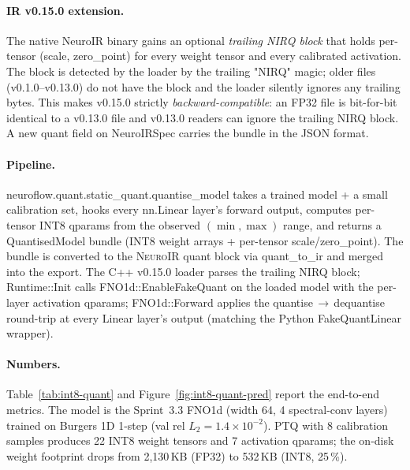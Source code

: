 \documentclass[10pt,twocolumn]{article}
\renewcommand{\texttt}[1]{{\normalfont\ttfamily #1}\normalfont\rmfamily}
\newcommand{\neuroir}{\textsc{NeuroIR}}
\begin{document}
\paragraph{IR v0.15.0 extension.}
The native NeuroIR binary gains an optional
\emph{trailing NIRQ block} that holds per-tensor
\texttt{(scale, zero\_point)} for every weight tensor and
every calibrated activation.  The block is detected by
the loader by the trailing \texttt{"NIRQ"} magic; older
files (v0.1.0--v0.13.0) do not have the block and the
loader silently ignores any trailing bytes.  This makes
v0.15.0 strictly \emph{backward-compatible}: an FP32
file is bit-for-bit identical to a v0.13.0 file and
v0.13.0 readers can ignore the trailing \texttt{NIRQ}
block.  A new \texttt{quant} field on
\texttt{NeuroIRSpec} carries the bundle in the JSON
format.

\paragraph{Pipeline.}
\texttt{neuroflow.quant.static\_quant.quantise\_model}
takes a trained model + a small calibration set, hooks
every \texttt{nn.Linear} layer's forward output, computes
per-tensor INT8 qparams from the observed
$(\min, \max)$ range, and returns a
\texttt{QuantisedModel} bundle (INT8 weight arrays +
per-tensor scale/zero\_point).  The bundle is converted
to the \neuroir{} \texttt{quant} block via
\texttt{quant\_to\_ir} and merged into the export.  The
C{++} v0.15.0 loader parses the trailing \texttt{NIRQ}
block; \texttt{Runtime::Init} calls
\texttt{FNO1d::EnableFakeQuant} on the loaded model with
the per-layer activation qparams; \texttt{FNO1d::Forward}
applies the quantise\,$\rightarrow$\,dequantise round-trip
at every Linear layer's output (matching the Python
\texttt{FakeQuantLinear} wrapper).

\paragraph{Numbers.}
Table~\ref{tab:int8-quant} and
Figure~\ref{fig:int8-quant-pred} report the
end-to-end metrics.  The model is the Sprint~3.3 FNO1d
(width 64, 4 spectral-conv layers) trained on Burgers 1D
1-step (val rel $L_2 = 1.4 \times 10^{-2}$).  PTQ with 8
calibration samples produces 22 INT8 weight tensors and 7
activation qparams; the on-disk weight footprint drops
from 2{,}130\,KB (FP32) to 532\,KB (INT8, 25\,\%).
\end{document}
